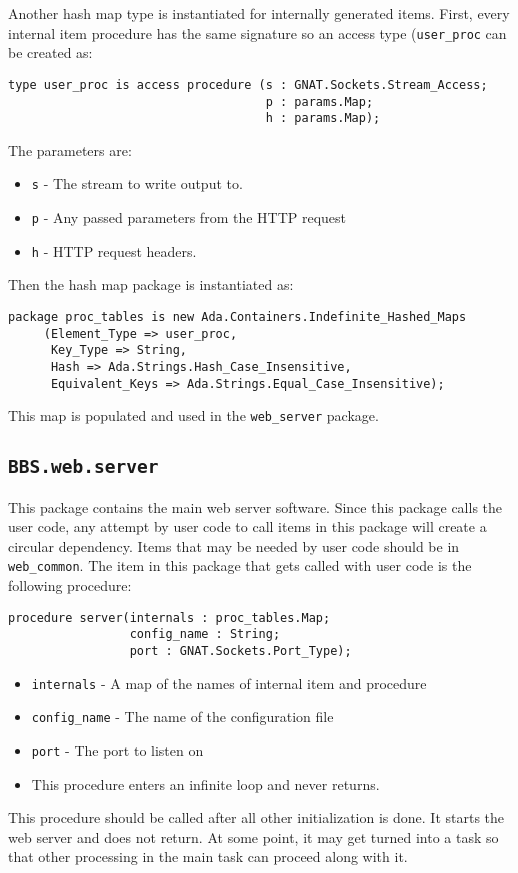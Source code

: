 \documentclass[10pt, openany]{book}
\newcommand{\package}[1]{\texttt{#1}}
\newcommand{\keyword}[1]{\texttt{#1}}
\newcommand{\datatype}[1]{\texttt{#1}}
\begin{document}
Another hash map type is instantiated for internally generated items.  First, every internal item procedure has the same signature so an access type (\datatype{user\_proc} can be created as:
\begin{lstlisting}
type user_proc is access procedure (s : GNAT.Sockets.Stream_Access;
                                    p : params.Map;
                                    h : params.Map);
\end{lstlisting}
The parameters are:
\begin{itemize}
  \item \keyword{s} - The stream to write output to.
  \item \keyword{p} - Any passed parameters from the HTTP request
  \item \keyword{h} - HTTP request headers.
\end{itemize}
Then the hash map package is instantiated as:
\begin{lstlisting}
package proc_tables is new Ada.Containers.Indefinite_Hashed_Maps
     (Element_Type => user_proc,
      Key_Type => String,
      Hash => Ada.Strings.Hash_Case_Insensitive,
      Equivalent_Keys => Ada.Strings.Equal_Case_Insensitive);
\end{lstlisting}
This map is populated and used in the \package{web\_server} package.

\subsection{\package{BBS.web.server}}
This package contains the main web server software.  Since this package calls the user code, any attempt by user code to call items in this package will create a circular dependency.  Items that may be needed by user code should be in \package{web\_common}.  The item in this package that gets called with user code is the following procedure:
\begin{lstlisting}
procedure server(internals : proc_tables.Map;
                 config_name : String;
                 port : GNAT.Sockets.Port_Type);
\end{lstlisting}
\begin{itemize}
  \item \keyword{internals} - A map of the names of internal item and procedure
  \item \keyword{config\_name} - The name of the configuration file
  \item \keyword{port} - The port to listen on
  \item This procedure enters an infinite loop and never returns.
\end{itemize}
This procedure should be called after all other initialization is done.  It starts the web server and does not return.  At some point, it may get turned into a task so that other processing in the main task can proceed along with it.
\end{document}

